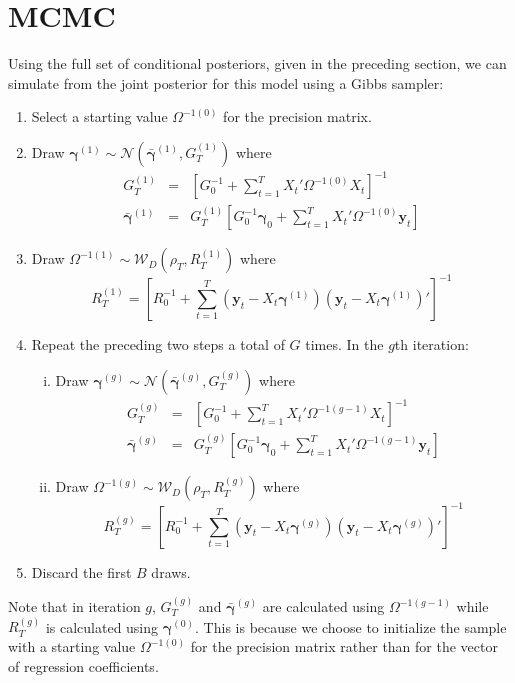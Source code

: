 \documentclass[12pt]{article}
\begin{document}
\section{MCMC}
Using the full set of conditional posteriors, given in the preceding section, we can simulate from the joint posterior for this model using a Gibbs sampler:
\begin{enumerate}
  \item Select a starting value $\Omega^{-1(0)}$ for the precision matrix.
  \item Draw $\boldsymbol{\gamma}^{(1)} \sim \mathcal{N}\left( \bar{\boldsymbol{\gamma}}^{(1)}, G_T^{(1)}\right)$ where
    \begin{eqnarray*}
      G_T^{(1)} &=& \left[ G_0^{-1} + \sum_{t=1}^T X_t' \Omega^{-1(0)} X_t \right]^{-1}\\
      \bar{\boldsymbol{\gamma}}^{(1)} &=& G_T^{(1)} \left[ G_0^{-1}\boldsymbol{\gamma}_0 + \sum_{t=1}^{T} X_t'\Omega^{-1(0)}\mathbf{y}_t \right]
    \end{eqnarray*}
  \item Draw $\Omega^{-1(1)} \sim \mathcal{W}_D\left(\rho_T, R_T^{(1)}\right)$ where
    \begin{equation*}
      R_T^{(1)} = \left[ R_0^{-1} + \sum_{t=1}^{T} \left( \mathbf{y}_t - X_t \boldsymbol{\gamma}^{(1)} \right)\left( \mathbf{y}_t - X_t \boldsymbol{\gamma}^{(1)} \right)' \right]^{-1}
    \end{equation*}
  \item Repeat the preceding two steps a total of $G$ times.
    In the $g$th iteration:
    \begin{enumerate}[(i)]
       \item Draw $\boldsymbol{\gamma}^{(g)} \sim \mathcal{N}\left( \bar{\boldsymbol{\gamma}}^{(g)}, G_T^{(g)}\right)$ where
    \begin{eqnarray*}
      G_T^{(g)} &=& \left[ G_0^{-1} + \sum_{t=1}^T X_t' \Omega^{-1(g-1)} X_t \right]^{-1}\\
      \bar{\boldsymbol{\gamma}}^{(g)} &=& G_T^{(g)} \left[ G_0^{-1}\boldsymbol{\gamma}_0 + \sum_{t=1}^{T} X_t'\Omega^{-1(g-1)}\mathbf{y}_t \right]
    \end{eqnarray*}
       \item Draw $\Omega^{-1(g)} \sim \mathcal{W}_D\left(\rho_T, R_T^{(g)}\right)$ where
    \begin{equation*}
      R_T^{(g)} = \left[ R_0^{-1} + \sum_{t=1}^{T} \left( \mathbf{y}_t - X_t \boldsymbol{\gamma}^{(g)} \right)\left( \mathbf{y}_t - X_t \boldsymbol{\gamma}^{(g)} \right)' \right]^{-1}
    \end{equation*}
    \end{enumerate}
  \item Discard the first $B$ draws.
\end{enumerate}
Note that in iteration $g$, $G_T^{(g)}$ and $\bar{\boldsymbol{\gamma}}^{(g)}$ are calculated using $\Omega^{-1(g-1)}$ while $R_T^{(g)}$ is calculated using $\boldsymbol{\gamma}^{(0)}$.
This is because we choose to initialize the sample with a starting value $\Omega^{-1(0)}$ for the precision matrix rather than for the vector of regression coefficients.
\end{document}
